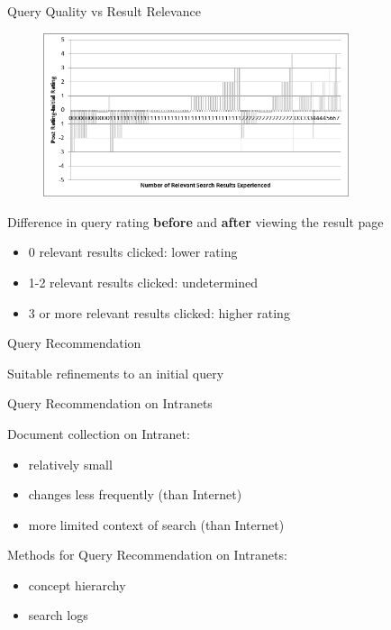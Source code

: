 \begin{frame}{Query Quality vs Result Relevance}
\begin{figure}
	\includegraphics[width=0.8\textwidth]{img/qquality.png}
\end{figure}
Difference in query rating \textbf{before} and \textbf{after} viewing the result page
\begin{itemize}
	\item 0 relevant results clicked: lower rating
	\item 1-2 relevant results clicked: undetermined
	\item 3 or more relevant results clicked: higher rating
\end{itemize}
\end{frame}

\begin{frame}{Query Recommendation}

Suitable refinements to an initial query

\end{frame}


\begin{frame}{Query Recommendation on Intranets}

Document collection on Intranet:
\begin{itemize}
	\item relatively small
	\item changes less frequently (than Internet)
	\item more limited context of search (than Internet) \newline
\end{itemize}

Methods for Query Recommendation on Intranets:
\begin{itemize}
	\item concept hierarchy
	\item search logs
\end{itemize} 

\end{frame}



